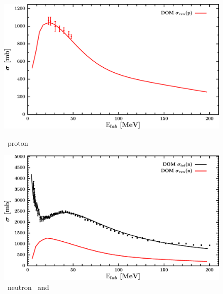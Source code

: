 \begin{figure}[hbtp]
    \centering
    \begin{minipage}{0.47\textwidth}
        \centering
        \includegraphics[width=\linewidth]{figures/ca48_protonInelastic.png}
        \caption*{\caEight\ proton \rxn}
        \label{DOMFitData_ca48_proton_inelastic}
    \end{minipage}\hspace{6pt}
    \begin{minipage}{0.47\textwidth}
        \centering
        \includegraphics[width=\textwidth]{figures/ca48_neutronInelastic.png}
        \caption*{\caEight\ neutron \rxn\ and \tot}
        \label{DOMFitData_ca48_neutron_inelastic}
    \end{minipage}
\end{figure}
\afterpage{\clearpage}
